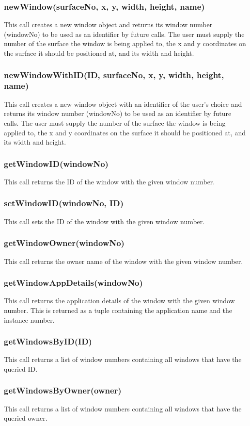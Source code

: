 \documentclass{acm_proc_article-sp}
\begin{document}
\subsubsection{newWindow(surfaceNo, x, y, width, height, name)}
This call creates a new window object and returns its window number (windowNo) to be used as an identifier by future calls. The user must supply the number of the surface the window is being applied to, the x and y coordinates on the surface it should be positioned at, and its width and height.
\subsubsection{newWindowWithID(ID, surfaceNo, x, y, width, height, name)}
This call creates a new window object with an identifier of the user's choice and returns its window number (windowNo) to be used as an identifier by future calls. The user must supply the number of the surface the window is being applied to, the x and y coordinates on the surface it should be positioned at, and its width and height.
\subsubsection{getWindowID(windowNo)}
This call returns the ID of the window with the given window number.
\subsubsection{setWindowID(windowNo, ID)}
This call sets the ID of the window with the given window number.
\subsubsection{getWindowOwner(windowNo)}
This call returns the owner name of the window with the given window number.
\subsubsection{getWindowAppDetails(windowNo)}
This call returns the application details of the window with the given window number. This is returned as a tuple containing the application name and the instance number.
\subsubsection{getWindowsByID(ID)}
This call returns a list of window numbers containing all windows that have the queried ID.
\subsubsection{getWindowsByOwner(owner)}
This call returns a list of window numbers containing all windows that have the queried owner.
\end{document}
